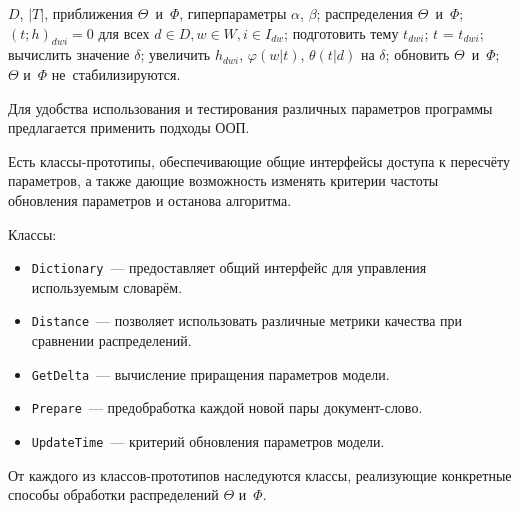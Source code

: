 \begin{algorithmic}[1]
    \REQUIRE
		$D$, $|T|$, приближения $\Theta$~и~$\Phi$, гиперпараметры $\alpha$, $\beta$;
    \ENSURE
        распределения $\Theta$~и~$\Phi$;
	\STATE $(t; h)_{dwi} = 0 $ для всех $d\in D, w \in W, {i \in I_{dw}}$;
    \REPEAT
			\STATE подготовить тему $t_{dwi}$; \; $t$ = $t_{dwi}$;			
			\STATE вычислить значение $\delta$;
			\STATE увеличить $h_{dwi}$, $\varphi(w|t)$, $\theta(t|d)$ на $\delta$;		
				\STATE обновить $\Theta$~и~$\Phi$;
			\ENDIF
        \ENDFOR
    \UNTIL $\Theta$ и~$\Phi$ не~стабилизируются.
\end{algorithmic} 

Для удобства использования и тестирования различных параметров программы предлагается применить подходы ООП.

Есть классы-прототипы, обеспечивающие общие интерфейсы доступа к пересчёту параметров, а также дающие возможность изменять критерии частоты обновления параметров и останова алгоритма.
\newcommand\newcl[1]{\item \texttt{#1}~--- }

Классы:
\begin{itemize}
	\newcl{Dictionary} предоставляет общий интерфейс для управления используемым словарём.
	\newcl{Distance} позволяет использовать различные метрики качества при сравнении распределений.
	\newcl{GetDelta} вычисление приращения параметров модели.
	\newcl{Prepare} предобработка каждой новой пары документ-слово.
	\newcl{UpdateTime} критерий обновления параметров модели.
\end{itemize}

От каждого из классов-прототипов наследуются классы, реализующие конкретные способы обработки распределений $\Theta$ и~$\Phi$.

